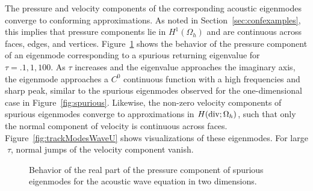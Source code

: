 \documentclass[10pt]{article}
\newcommand{\Oh}{\Omega_h}
\begin{document}
The pressure and velocity components of the corresponding acoustic eigenmodes converge to conforming approximations.  As noted in Section~\ref{sec:confexamples}, this implies that pressure components lie in $H^1(\Oh)$ and are continuous across faces, edges, and vertices.  Figure~\ref{fig:trackModesWave} shows the behavior of the pressure component of an eigenmode corresponding to a spurious returning eigenvalue for $\tau = .1, 1, 100$.  As $\tau$ increases and the eigenvalue approaches the imaginary axis, the eigenmode approaches a $C^0$ continuous function with a high frequencies and sharp peak, similar to the spurious eigenmodes observed for the one-dimensional case in Figure~\ref{fig:spurious}.  Likewise, the non-zero velocity components of spurious eigenmodes converge to approximations in $H({\rm div}; \Oh)$, such that only the normal component of velocity is continuous across faces.  Figure~\ref{fig:trackModesWaveU} shows visualizations of these eigenmodes.  For large $\tau$, normal jumps of the velocity component vanish.  %


\begin{figure}
\centering
{}
\hspace{.5em}
\hspace{.5em}
\caption{Behavior of the real part of the pressure component of spurious eigenmodes for the acoustic wave equation in two dimensions.  }
\label{fig:trackModesWave}
\end{figure}
\end{document}

